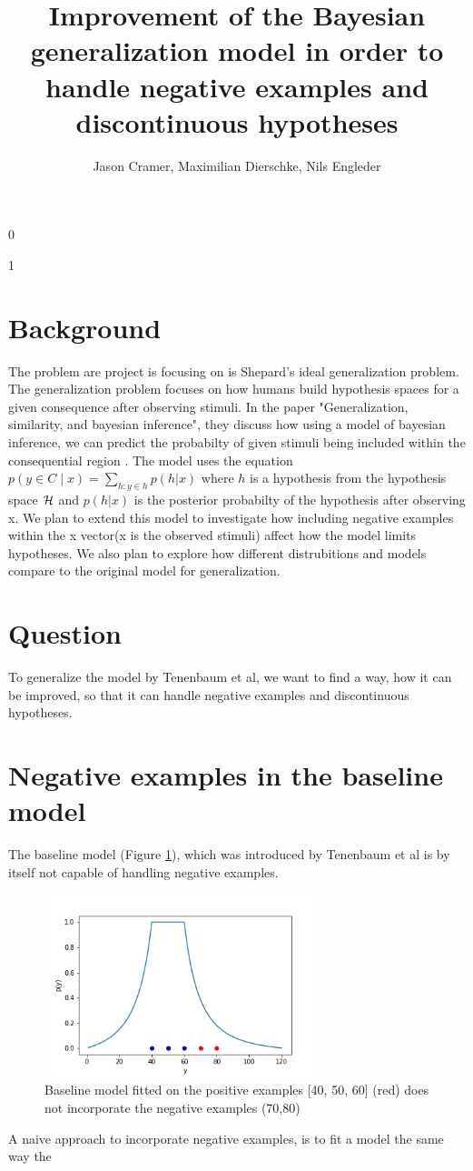 \documentclass[]{scrartcl}
\title{Improvement of the Bayesian generalization model in order to handle negative examples and discontinuous hypotheses}
\begin{document}
\def\isblind{1}
\if\isblind0
    \author{Jason Cramer, Maximilian Dierschke, Nils Engleder}\fi
\if \isblind1
    \author{}\fi

\maketitle

\section{Background}
The problem are project is focusing on is Shepard's ideal generalization problem. The generalization problem focuses on how humans build hypothesis spaces for a given consequence after observing stimuli.
In the paper "Generalization, similarity, and bayesian inference", they discuss how using a model of bayesian inference, we can predict the probabilty of given stimuli being included within the consequential region \cite{Tenenbaum}.
The model uses the equation $p(y \in C \mid x) = \sum\limits_{h:y\in h} p(h | x)$ where $h$ is a hypothesis from the hypothesis space ${\cal H}$ and $p(h | x)$ is the posterior probabilty of  the hypothesis after observing x.
We plan to extend this model to investigate how including negative examples within the x vector(x is the observed stimuli) affect how the model limits hypotheses. We also plan to explore how different distrubitions and models compare to the original model for generalization.
\section{Question}
To generalize the model by Tenenbaum et al, we want to find a way, how it can be improved, so that it can handle negative examples and discontinuous hypotheses.
\section{Negative examples in the baseline model}
The baseline model (Figure \ref{fig:baseline}), which was introduced by Tenenbaum et al is by itself not capable of handling negative examples.

\begin{figure}[t]
	\includegraphics[width=8cm]{baseline.png}
	\centering
	\caption{Baseline model fitted on the positive examples [40, 50, 60] (red) does not incorporate the negative examples (70,80) }
	\label{fig:baseline}
\end{figure}
A naive approach to incorporate negative examples, is to fit a model the same way the 
\end{document}
